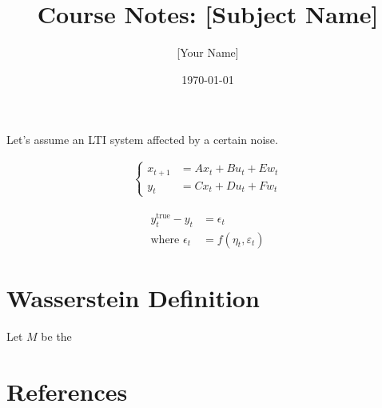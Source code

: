 \documentclass[12pt, a4paper]{article}
\title{Course Notes: [Subject Name]}
\author{[Your Name]}
\date{\today}
\begin{document}
\maketitle
\tableofcontents

Let's assume an LTI system affected by a certain noise. 

\begin{align}
    \begin{cases}
        x_{t+1} &= Ax_t + Bu_t + Ew_t \\
        y_t &= Cx_t + Du_t + Fw_t
    \end{cases}
\end{align}



\begin{align}
    y_t^{\text{true}} - y_t &= \epsilon_t \\
    \text{where } \epsilon_t &= f(\eta_t, \varepsilon_t)
\end{align}






\section{Wasserstein Definition}
Let $M$ be the \cite{chen2024data}







\section{References}
 

\end{document}
